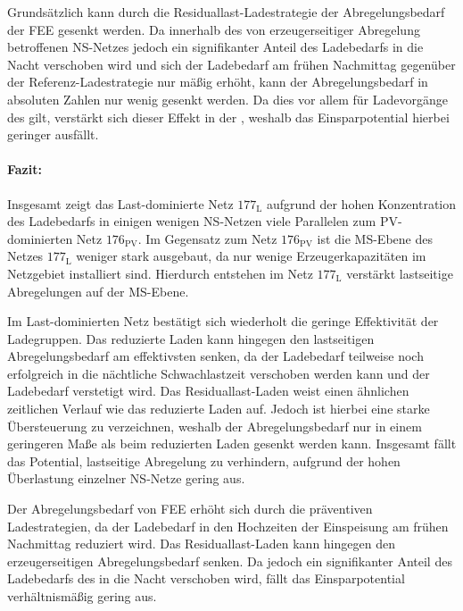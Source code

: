 

Grundsätzlich kann durch die Residuallast-Ladestrategie der Abregelungsbedarf der \gls{FEE} gesenkt werden.
Da innerhalb des von erzeugerseitiger Abregelung betroffenen \gls{NS}-Netzes jedoch ein signifikanter Anteil des Ladebedarfs in die Nacht verschoben wird und sich der Ladebedarf am frühen Nachmittag gegenüber der Referenz-Ladestrategie nur mäßig erhöht, kann der Abregelungsbedarf in absoluten Zahlen nur wenig gesenkt werden.
Da dies vor allem für Ladevorgänge des \UC \zH gilt, verstärkt sich dieser Effekt in der \SzeFirmenparkplatzdot, weshalb das Einsparpotential hierbei geringer ausfällt.


\paragraph{Fazit:}

Insgesamt zeigt das Last-dominierte Netz \(177_{\text{L}}\) aufgrund der hohen Konzentration des Ladebedarfs in einigen wenigen \gls{NS}-Netzen viele Parallelen zum \gls{PV}-dominierten Netz \(176_{\text{PV}}\).
Im Gegensatz zum Netz \(176_{\text{PV}}\) ist die \gls{MS}-Ebene des Netzes \(177_{\text{L}}\) weniger stark ausgebaut, da nur wenige Erzeugerkapazitäten im Netzgebiet installiert sind.
Hierdurch entstehen im Netz \(177_{\text{L}}\) verstärkt lastseitige Abregelungen auf der \gls{MS}-Ebene.\medskip

Im Last-dominierten Netz bestätigt sich wiederholt die geringe Effektivität der Ladegruppen.
Das reduzierte Laden kann hingegen den lastseitigen Abregelungsbedarf am effektivsten senken, da der Ladebedarf teilweise noch erfolgreich in die nächtliche Schwachlastzeit verschoben werden kann und der Ladebedarf verstetigt wird.
Das Residuallast-Laden weist einen ähnlichen zeitlichen Verlauf wie das reduzierte Laden auf.
Jedoch ist hierbei eine starke Übersteuerung zu verzeichnen, weshalb der Abregelungsbedarf nur in einem geringeren Maße als beim reduzierten Laden gesenkt werden kann.
Insgesamt fällt das Potential, lastseitige Abregelung zu verhindern, aufgrund der hohen Überlastung einzelner \gls{NS}-Netze gering aus.\medskip

Der Abregelungsbedarf von \gls{FEE} erhöht sich durch die präventiven Ladestrategien, da der Ladebedarf in den Hochzeiten der Einspeisung am frühen Nachmittag reduziert wird.
Das Residuallast-Laden kann hingegen den erzeugerseitigen Abregelungsbedarf senken.
Da jedoch ein signifikanter Anteil des Ladebedarfs des \UC \zH in die Nacht verschoben wird, fällt das Einsparpotential verhältnismäßig gering aus.

\clearpage

